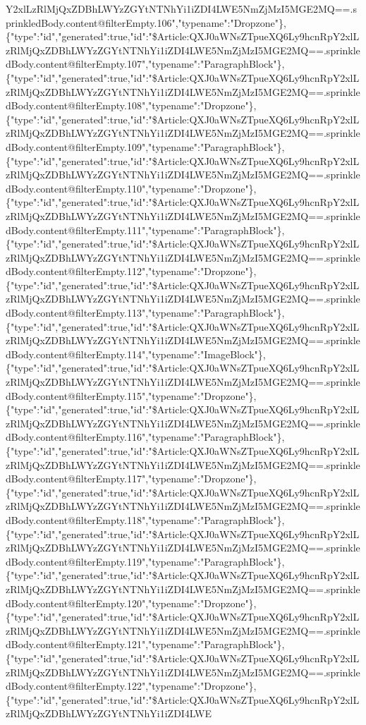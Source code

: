 Y2xlLzRlMjQxZDBhLWYzZGYtNTNhYi1iZDI4LWE5NmZjMzI5MGE2MQ==.sprinkledBody.content@filterEmpty.106","typename":"Dropzone"\},\{"type":"id","generated":true,"id":"\$Article:QXJ0aWNsZTpueXQ6Ly9hcnRpY2xlLzRlMjQxZDBhLWYzZGYtNTNhYi1iZDI4LWE5NmZjMzI5MGE2MQ==.sprinkledBody.content@filterEmpty.107","typename":"ParagraphBlock"\},\{"type":"id","generated":true,"id":"\$Article:QXJ0aWNsZTpueXQ6Ly9hcnRpY2xlLzRlMjQxZDBhLWYzZGYtNTNhYi1iZDI4LWE5NmZjMzI5MGE2MQ==.sprinkledBody.content@filterEmpty.108","typename":"Dropzone"\},\{"type":"id","generated":true,"id":"\$Article:QXJ0aWNsZTpueXQ6Ly9hcnRpY2xlLzRlMjQxZDBhLWYzZGYtNTNhYi1iZDI4LWE5NmZjMzI5MGE2MQ==.sprinkledBody.content@filterEmpty.109","typename":"ParagraphBlock"\},\{"type":"id","generated":true,"id":"\$Article:QXJ0aWNsZTpueXQ6Ly9hcnRpY2xlLzRlMjQxZDBhLWYzZGYtNTNhYi1iZDI4LWE5NmZjMzI5MGE2MQ==.sprinkledBody.content@filterEmpty.110","typename":"Dropzone"\},\{"type":"id","generated":true,"id":"\$Article:QXJ0aWNsZTpueXQ6Ly9hcnRpY2xlLzRlMjQxZDBhLWYzZGYtNTNhYi1iZDI4LWE5NmZjMzI5MGE2MQ==.sprinkledBody.content@filterEmpty.111","typename":"ParagraphBlock"\},\{"type":"id","generated":true,"id":"\$Article:QXJ0aWNsZTpueXQ6Ly9hcnRpY2xlLzRlMjQxZDBhLWYzZGYtNTNhYi1iZDI4LWE5NmZjMzI5MGE2MQ==.sprinkledBody.content@filterEmpty.112","typename":"Dropzone"\},\{"type":"id","generated":true,"id":"\$Article:QXJ0aWNsZTpueXQ6Ly9hcnRpY2xlLzRlMjQxZDBhLWYzZGYtNTNhYi1iZDI4LWE5NmZjMzI5MGE2MQ==.sprinkledBody.content@filterEmpty.113","typename":"ParagraphBlock"\},\{"type":"id","generated":true,"id":"\$Article:QXJ0aWNsZTpueXQ6Ly9hcnRpY2xlLzRlMjQxZDBhLWYzZGYtNTNhYi1iZDI4LWE5NmZjMzI5MGE2MQ==.sprinkledBody.content@filterEmpty.114","typename":"ImageBlock"\},\{"type":"id","generated":true,"id":"\$Article:QXJ0aWNsZTpueXQ6Ly9hcnRpY2xlLzRlMjQxZDBhLWYzZGYtNTNhYi1iZDI4LWE5NmZjMzI5MGE2MQ==.sprinkledBody.content@filterEmpty.115","typename":"Dropzone"\},\{"type":"id","generated":true,"id":"\$Article:QXJ0aWNsZTpueXQ6Ly9hcnRpY2xlLzRlMjQxZDBhLWYzZGYtNTNhYi1iZDI4LWE5NmZjMzI5MGE2MQ==.sprinkledBody.content@filterEmpty.116","typename":"ParagraphBlock"\},\{"type":"id","generated":true,"id":"\$Article:QXJ0aWNsZTpueXQ6Ly9hcnRpY2xlLzRlMjQxZDBhLWYzZGYtNTNhYi1iZDI4LWE5NmZjMzI5MGE2MQ==.sprinkledBody.content@filterEmpty.117","typename":"Dropzone"\},\{"type":"id","generated":true,"id":"\$Article:QXJ0aWNsZTpueXQ6Ly9hcnRpY2xlLzRlMjQxZDBhLWYzZGYtNTNhYi1iZDI4LWE5NmZjMzI5MGE2MQ==.sprinkledBody.content@filterEmpty.118","typename":"ParagraphBlock"\},\{"type":"id","generated":true,"id":"\$Article:QXJ0aWNsZTpueXQ6Ly9hcnRpY2xlLzRlMjQxZDBhLWYzZGYtNTNhYi1iZDI4LWE5NmZjMzI5MGE2MQ==.sprinkledBody.content@filterEmpty.119","typename":"ParagraphBlock"\},\{"type":"id","generated":true,"id":"\$Article:QXJ0aWNsZTpueXQ6Ly9hcnRpY2xlLzRlMjQxZDBhLWYzZGYtNTNhYi1iZDI4LWE5NmZjMzI5MGE2MQ==.sprinkledBody.content@filterEmpty.120","typename":"Dropzone"\},\{"type":"id","generated":true,"id":"\$Article:QXJ0aWNsZTpueXQ6Ly9hcnRpY2xlLzRlMjQxZDBhLWYzZGYtNTNhYi1iZDI4LWE5NmZjMzI5MGE2MQ==.sprinkledBody.content@filterEmpty.121","typename":"ParagraphBlock"\},\{"type":"id","generated":true,"id":"\$Article:QXJ0aWNsZTpueXQ6Ly9hcnRpY2xlLzRlMjQxZDBhLWYzZGYtNTNhYi1iZDI4LWE5NmZjMzI5MGE2MQ==.sprinkledBody.content@filterEmpty.122","typename":"Dropzone"\},\{"type":"id","generated":true,"id":"\$Article:QXJ0aWNsZTpueXQ6Ly9hcnRpY2xlLzRlMjQxZDBhLWYzZGYtNTNhYi1iZDI4LWE
